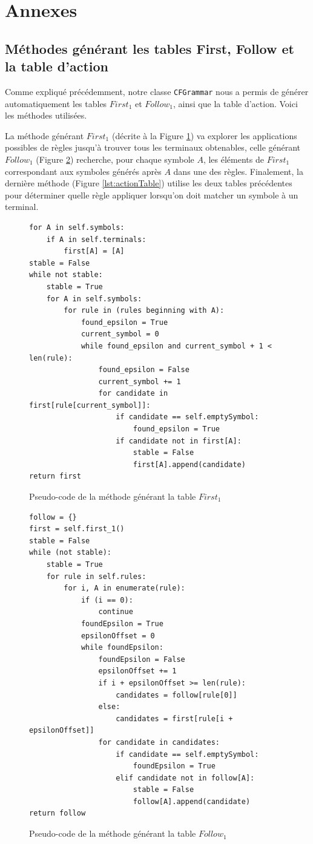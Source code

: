 \documentclass[a4paper,10pt]{article}
\begin{document}
\section{Annexes}

\subsection{Méthodes générant les tables First, Follow et la table d'action}

\label{anx:FirstFollowAT}

Comme expliqué précédemment, notre classe \verb?CFGrammar? nous a permis de générer automatiquement les tables $First_1$ et $Follow_1$, ainsi que la table d'action. Voici les méthodes utilisées.

La méthode générant $First_1$ (décrite à la Figure \ref{lst:first_1}) va explorer les applications possibles de règles jusqu'à trouver tous les terminaux obtenables, celle générant $Follow_1$ (Figure \ref{lst:follow_1}) recherche, pour chaque symbole $A$, les éléments de $First_1$ correspondant aux symboles générés après $A$ dans une des règles. Finalement, la dernière méthode (Figure \ref{lst:actionTable}) utilise les deux tables précédentes pour déterminer quelle règle appliquer lorsqu'on doit matcher un symbole à un terminal.

\begin{figure}[H]
\begin{lstlisting}
for A in self.symbols:
	if A in self.terminals:
		first[A] = [A]
stable = False
while not stable:
	stable = True
	for A in self.symbols:
		for rule in (rules beginning with A):
			found_epsilon = True
			current_symbol = 0
			while found_epsilon and current_symbol + 1 < len(rule):
				found_epsilon = False
				current_symbol += 1
				for candidate in first[rule[current_symbol]]:
					if candidate == self.emptySymbol:
						found_epsilon = True
					if candidate not in first[A]:
						stable = False
						first[A].append(candidate)
return first
\end{lstlisting}
\fontfamily{}
\caption{Pseudo-code de la méthode générant la table $First_1$}
\label{lst:first_1}
\end{figure}

\begin{figure}[H]
\begin{lstlisting}
follow = {}
first = self.first_1()
stable = False
while (not stable):
	stable = True
	for rule in self.rules:
		for i, A in enumerate(rule):
			if (i == 0):
				continue
			foundEpsilon = True
			epsilonOffset = 0
			while foundEpsilon:
				foundEpsilon = False
				epsilonOffset += 1
				if i + epsilonOffset >= len(rule):
					candidates = follow[rule[0]]
				else:
					candidates = first[rule[i + epsilonOffset]]
				for candidate in candidates:
					if candidate == self.emptySymbol:
						foundEpsilon = True
					elif candidate not in follow[A]:
						stable = False
						follow[A].append(candidate)
return follow
\end{lstlisting}
\fontfamily{}
\caption{Pseudo-code de la méthode générant la table $Follow_1$}
\label{lst:follow_1}
\end{figure}
\end{document}
